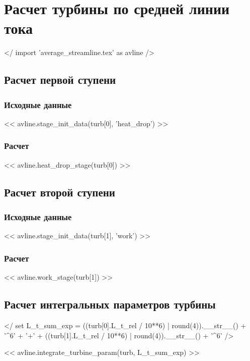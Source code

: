 \documentclass[a4paper,10pt]{article}
\begin{document}
    \section{Расчет турбины по средней линии тока}

    </ import 'average_streamline.tex' as avline />

    \subsection{Расчет первой ступени}

    \subsubsection{Исходные данные}

    << avline.stage_init_data(turb[0], 'heat_drop') >>

    \subsubsection{Расчет}

    << avline.heat_drop_stage(turb[0]) >>

    \subsection{Расчет второй ступени}

    \subsubsection{Исходные данные}

    << avline.stage_init_data(turb[1], 'work') >>

    \subsubsection{Расчет}

    << avline.work_stage(turb[1]) >>

    \subsection{Расчет интегральных параметров турбины}

    </ set L_t_sum_exp = ((turb[0].L_t_rel / 10**6) | round(4)).__str__() + '^6' + '+' +
        ((turb[1].L_t_rel / 10**6) | round(4)).__str__() + '^6' />

    << avline.integrate_turbine_param(turb, L_t_sum_exp) >>
\end{document}
